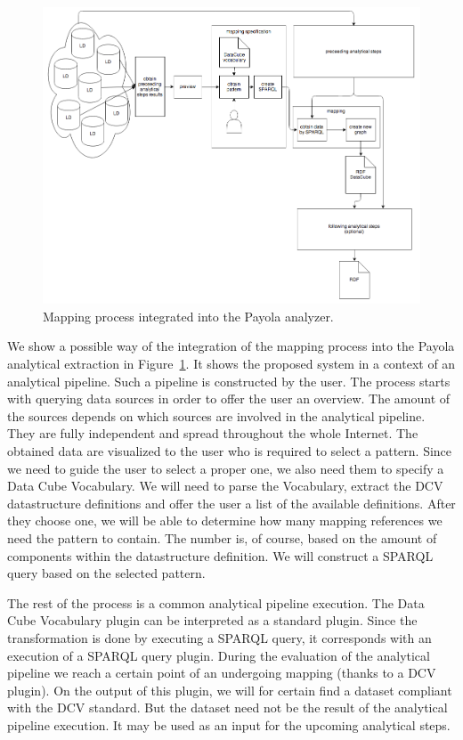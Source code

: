 \begin{figure}
	\centering
	\includegraphics[width=140mm]{img/payola-mapping.png}
	\caption{Mapping process integrated into the Payola analyzer.}
	\label{fig:payola-mapping}
\end{figure}

We show a possible way of the integration of the mapping process into the Payola analytical extraction
in Figure~\ref{fig:payola-mapping}. It shows the proposed system in a context of an
analytical pipeline. Such a pipeline is constructed by the user. The process starts with querying data 
sources in order to offer the user an overview. The amount of the sources depends 
on which sources are involved in the analytical pipeline. They are fully independent 
and spread throughout the whole Internet. The obtained data are visualized to 
the user who is required to select a pattern. Since we need to guide the user 
to select a proper one, we also need them to specify a Data Cube Vocabulary. 
We will need to parse the Vocabulary, extract the DCV datastructure definitions 
and offer the user a list of the available definitions. After they choose one, we will be able to determine how many mapping references we need the 
pattern to contain. The number is, of course, based on the amount of components 
within the datastructure definition. We will construct a SPARQL query based on the selected pattern.

The rest of the process is a common analytical pipeline execution. The Data Cube 
Vocabulary plugin can be interpreted as a standard plugin. Since the 
transformation is done by executing a SPARQL query, it corresponds with an 
execution of a SPARQL query plugin. During the evaluation of the analytical pipeline we reach a certain point of an undergoing mapping (thanks to a DCV plugin). On the output of this plugin, we will for certain find a dataset compliant with the DCV standard. But the dataset need not 
be the result of the analytical pipeline execution. It may be used as an input 
for the upcoming analytical steps.

